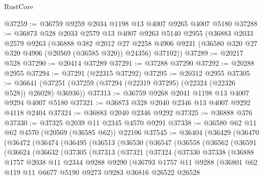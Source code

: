 \begin{lexlean}{RustCore}
\begin{coremodule}
@37259 := @36759 @9259 @2034 @1198 @13 @4007 @9265 @4007 @5180
@37288 := @36873
    @528
    @2033
    @2579
    @13
    @4007
    @9263
    @5140
    @2955
    (@36883
      @2033
      @2579
      @9263
      (@36888
        @382
        @2012
        @27
        @2258
        @4906
        @9231
        (@36580 @320 @27 @320 @4906 (@20569 (@36585 @320)) @24356)
        @37102))
@37289 := @20217 @528
@37290 := @20414 @37289
@37291 := @37288 @37290
@37292 := @20288 @2955
@37294 := @37291 (@22315 @37292)
@37295 := @20312 @2955
@37305 := @36641 (@37251 (@37259 (@37294 (@22319 @37295) (@22324 (@22326 @528)) @26028) @36936))
@37313 := @36759 @9268 @2041 @1198 @13 @4007 @9294 @4007 @5180
@37321 := @36873 @328 @2040 @2346 @13 @4007 @9292 @4118 @2404
@37324 := @36883 @2040 @2346 @9292
@37325 := @36888 @376
@37330 := @37325 @2039 @11 @2345 @4570 @9291
@37338 := @36580 @62 @11 @62 @4570 (@20569 (@36585 @62)) @22106
@37545 := @36404
    (@36429
      (@36470
        (@36472
          (@36474
            (@36495
              (@36513
                (@36530
                  (@36547
                    (@36558
                      (@36562
                        (@36591
                          (@36624
                            (@36632
                              (@37305
                                (@37313
                                  (@37321
                                    (@37324
                                      (@37330
                                        @37338
                                        (@36888
                                          @1757
                                          @2038
                                          @11
                                          @2344
                                          @9288
                                          @9290
                                          (@36793
                                            @1757
                                            @11
                                            @9288
                                            (@36801
                                              @62
                                              @119
                                              @11
                                              @6677
                                              @5190
                                              @9273
                                              @9283
                                              @36816
                                              @26522
                                              @26528

\end{coremodule}
\end{lexlean}
